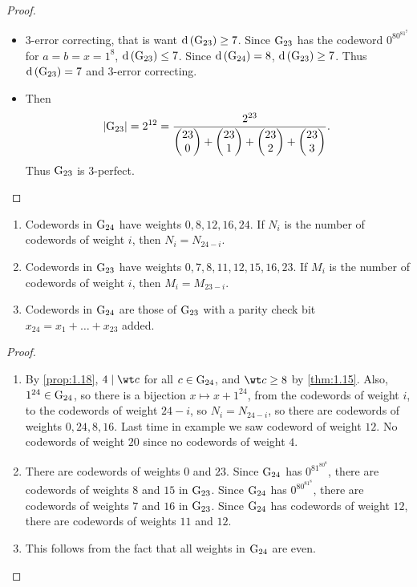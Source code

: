 \begin{proof}
\hfill
\begin{itemize}
\item $ 3 $-error correcting, that is want $ \d\br{\G_{23}} \ge 7 $. Since $ \mathrm{G}_{23} $ has the codeword $ 0^80^81^7 $ for $ a = b = x = 1^8 $, $ \d\br{\G_{23}} \le 7 $. Since $ \d\br{\G_{24}} = 8 $, $ \d\br{\G_{23}} \ge 7 $. Thus $ \d\br{\G_{23}} = 7 $ and $ 3 $-error correcting.
\item Then
$$ \abs{\mathrm{G}_{23}} = 2^{12} = \dfrac{2^{23}}{\begin{pmatrix} 23 \\ 0 \end{pmatrix} + \begin{pmatrix} 23 \\ 1 \end{pmatrix} + \begin{pmatrix} 23 \\ 2 \end{pmatrix} + \begin{pmatrix} 23 \\ 3 \end{pmatrix}}. $$
Thus $ \mathrm{G}_{23} $ is $ 3 $-perfect.
\end{itemize}
\end{proof}

\begin{proposition}
\hfill
\begin{enumerate}
\item Codewords in $ \mathrm{G}_{24} $ have weights $ 0, 8, 12, 16, 24 $. If $ N_i $ is the number of codewords of weight $ i $, then $ N_i = N_{24 - i} $.
\item Codewords in $ \mathrm{G}_{23} $ have weights $ 0, 7, 8, 11, 12, 15, 16, 23 $. If $ M_i $ is the number of codewords of weight $ i $, then $ M_i = M_{23 - i} $.
\item Codewords in $ \mathrm{G}_{24} $ are those of $ \mathrm{G}_{23} $ with a parity check bit $ x_{24} = x_1 + \dots + x_{23} $ added.
\end{enumerate}
\end{proposition}

\begin{proof}
\hfill
\begin{enumerate}
\item By \ref{prop:1.18}, $ 4 \mid \wt c $ for all $ c \in \mathrm{G}_{24} $, and $ \wt c \ge 8 $ by \ref{thm:1.15}. Also, $ 1^{24} \in \mathrm{G}_{24} $, so there is a bijection $ x \mapsto x + 1^{24} $, from the codewords of weight $ i $, to the codewords of weight $ 24 - i $, so $ N_i = N_{24 - i} $, so there are codewords of weights $ 0, 24, 8, 16 $. Last time in example we saw codeword of weight $ 12 $. No codewords of weight $ 20 $ since no codewords of weight $ 4 $.
\item There are codewords of weights $ 0 $ and $ 23 $. Since $ \mathrm{G}_{24} $ has $ 0^81^80^8 $, there are codewords of weights $ 8 $ and $ 15 $ in $ \mathrm{G}_{23} $. Since $ \mathrm{G}_{24} $ has $ 0^80^81^8 $, there are codewords of weights $ 7 $ and $ 16 $ in $ \mathrm{G}_{23} $. Since $ \mathrm{G}_{24} $ has codewords of weight $ 12 $, there are codewords of weights $ 11 $ and $ 12 $.
\item This follows from the fact that all weights in $ \mathrm{G}_{24} $ are even.
\end{enumerate}
\end{proof}

